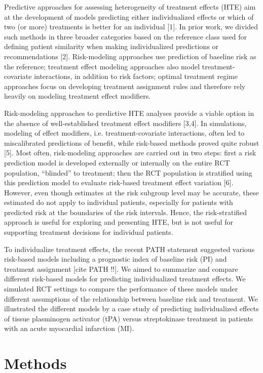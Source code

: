 \documentclass{article}
\begin{document}
Predictive approaches for assessing heterogeneity of treatment effects
(HTE) aim at the development of models predicting either individualized
effects or which of two (or more) treatments is better for an individual
{[}1{]}. In prior work, we divided such methods in three broader
categories based on the reference class used for defining patient
similarity when making individualized predictions or recommendations
{[}2{]}. Risk-modeling approaches use prediction of baseline risk as the
reference; treatment effect modeling approaches also model
treatment-covariate interactions, in addition to risk factors; optimal
treatment regime approaches focus on developing treatment assignment
rules and therefore rely heavily on modeling treatment effect modifiers.

Risk-modeling approaches to predictive HTE analyses provide a viable
option in the absence of well-established treatment effect modifiers
{[}3,4{]}. In simulations, modeling of effect modifiers, i.e.
treatment-covariate interactions, often led to miscalibrated predictions
of benefit, while risk-based methods proved quite robust {[}5{]}. Most
often, risk-modeling approaches are carried out in two steps: first a
risk prediction model is developed externally or internally on the
entire RCT population, ``blinded'' to treatment; then the RCT population
is stratified using this prediction model to evaluate risk-based
treatment effect variation {[}6{]}. However, even though estimates at
the risk subgroup level may be accurate, these estimated do not apply to
individual patients, especially for patients with predicted risk at the
boundaries of the risk intervals. Hence, the risk-stratified approach is
useful for exploring and presenting HTE, but is not useful for
supporting treatment decisions for individual patients.

To individualize treatment effects, the recent PATH statement suggested
various risk-based models including a prognostic index of baseline risk
(PI) and treatment assignment {[}cite PATH !!{]}. We aimed to summarize
and compare different risk-based models for predicting individualized
treatment effects. We simulated RCT settings to compare the performance
of these models under different assumptions of the relationship between
baseline risk and treatment. We illustrated the different models by a
case study of predicting individualized effects of tissue plasminogen
activator (tPA) versus streptokinase treatment in patients with an acute
myocardial infarction (MI).

\hypertarget{methods}{%
\section{Methods}\label{methods}}
\end{document}
